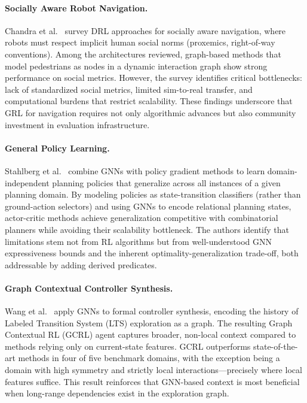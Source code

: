 \documentclass{article}
\begin{document}
\paragraph{Socially Aware Robot Navigation.}
Chandra et al.~\cite{social_nav2025} survey DRL approaches for socially aware navigation, where robots must respect implicit human social norms (proxemics, right-of-way conventions). Among the architectures reviewed, graph-based methods that model pedestrians as nodes in a dynamic interaction graph show strong performance on social metrics. However, the survey identifies critical bottlenecks: lack of standardized social metrics, limited sim-to-real transfer, and computational burdens that restrict scalability. These findings underscore that GRL for navigation requires not only algorithmic advances but also community investment in evaluation infrastructure.

\paragraph{General Policy Learning.}
Stahlberg et al.~\cite{gen_policies2025} combine GNNs with policy gradient methods to learn domain-independent planning policies that generalize across all instances of a given planning domain. By modeling policies as state-transition classifiers (rather than ground-action selectors) and using GNNs to encode relational planning states, actor-critic methods achieve generalization competitive with combinatorial planners while avoiding their scalability bottleneck. The authors identify that limitations stem not from RL algorithms but from well-understood GNN expressiveness bounds and the inherent optimality-generalization trade-off, both addressable by adding derived predicates.

\paragraph{Graph Contextual Controller Synthesis.}
Wang et al.~\cite{gcrl2025} apply GNNs to formal controller synthesis, encoding the history of Labeled Transition System (LTS) exploration as a graph. The resulting Graph Contextual RL (GCRL) agent captures broader, non-local context compared to methods relying only on current-state features. GCRL outperforms state-of-the-art methods in four of five benchmark domains, with the exception being a domain with high symmetry and strictly local interactions---precisely where local features suffice. This result reinforces that GNN-based context is most beneficial when long-range dependencies exist in the exploration graph.
\end{document}
